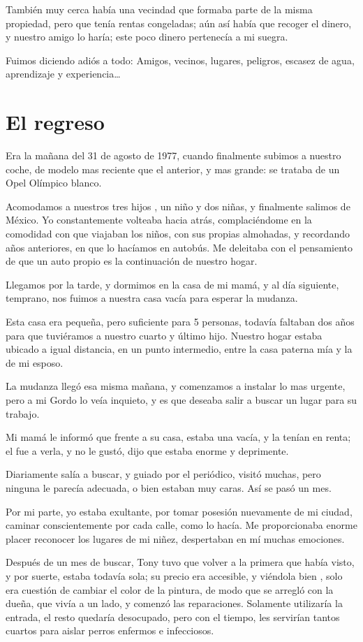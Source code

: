 \documentclass[letterpaper, 12pt]{book}
\begin{document}
También muy cerca había una vecindad que formaba parte de la misma propiedad, pero que tenía rentas congeladas; aún así había que recoger el dinero, y nuestro amigo lo haría; este poco dinero pertenecía a mi suegra.

Fuimos diciendo adiós a todo: Amigos, vecinos, lugares, peligros, escasez de agua, aprendizaje y experiencia\ldots
\chapter{El regreso}
Era la mañana del 31 de agosto de 1977, cuando finalmente subimos a nuestro coche, de modelo mas reciente que el anterior, y mas grande: se trataba de un Opel Olímpico blanco.

Acomodamos a nuestros tres hijos , un niño y dos niñas, y finalmente salimos de México. Yo constantemente volteaba hacia atrás, complaciéndome en la comodidad con que viajaban los niños, con sus propias almohadas, y recordando años anteriores, en que lo hacíamos en autobús. Me deleitaba con el pensamiento de que un auto propio es la continuación de nuestro hogar.

Llegamos por la tarde, y dormimos en la casa de mi mamá, y al día siguiente, temprano, nos fuimos a nuestra casa vacía para esperar la mudanza.

Esta casa era pequeña, pero suficiente para 5 personas, todavía faltaban dos años para que tuviéramos a nuestro cuarto y último hijo. Nuestro hogar estaba ubicado a igual distancia, en un punto intermedio, entre la casa paterna mía y la de mi esposo.

La mudanza llegó esa misma mañana, y comenzamos a instalar lo mas urgente, pero a mi Gordo lo veía inquieto, y es que deseaba salir a buscar un lugar para su trabajo. 

Mi mamá le informó que frente a su casa, estaba una vacía, y la tenían en renta; el fue a verla, y no le gustó, dijo que estaba enorme y deprimente.

Diariamente salía a buscar, y guiado por el periódico, visitó muchas, pero ninguna le parecía adecuada, o bien estaban muy caras. Así se pasó un mes.

Por mi parte, yo estaba exultante, por tomar posesión nuevamente de mi ciudad, caminar conscientemente por cada calle, como lo hacía. Me proporcionaba enorme placer reconocer los lugares de mi niñez, despertaban en mí muchas emociones. 

Después de un mes de buscar, Tony tuvo que volver a la primera que había visto, y por suerte, estaba todavía sola; su precio era accesible, y viéndola bien , solo era cuestión de cambiar el color de la pintura, de modo que se arregló con la dueña, que vivía a un lado, y comenzó las reparaciones. Solamente utilizaría la entrada, el resto quedaría desocupado, pero con el tiempo, les servirían tantos cuartos para aislar perros enfermos e infecciosos. 
\end{document}
